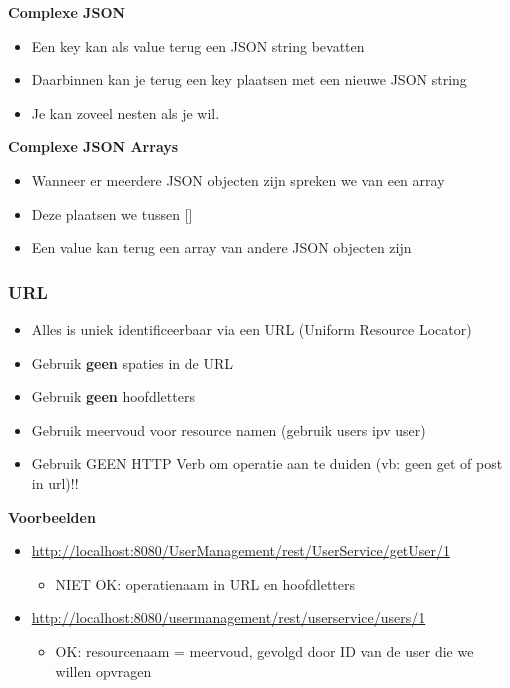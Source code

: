 \documentclass{article}
\newcommand{\bold}[1]{\textbf{#1}}
\begin{document}
\bold{Complexe JSON}

\begin{itemize}
    \item Een key kan als value terug een JSON string bevatten
    \item Daarbinnen kan je terug een key plaatsen met een nieuwe JSON string
    \item Je kan zoveel nesten als je wil.
\end{itemize}

\bold{Complexe JSON Arrays}

\begin{itemize}
    \item Wanneer er meerdere JSON objecten zijn spreken we van een array
    \item Deze plaatsen we tussen []
    \item Een value kan terug een array van andere JSON objecten zijn
\end{itemize}

\subsubsection{URL}
\begin{itemize}
    \item Alles is uniek identificeerbaar via een URL (Uniform Resource Locator)
    \item Gebruik \bold{geen} spaties in de URL
    \item Gebruik \bold{geen} hoofdletters
    \item Gebruik meervoud voor resource namen (gebruik users ipv user)
    \item Gebruik GEEN HTTP Verb om operatie aan te duiden (vb: geen get of post in url)!!
\end{itemize}

\bold{Voorbeelden}

\begin{itemize}
    \item \url{http://localhost:8080/UserManagement/rest/UserService/getUser/1} 
    \begin{itemize}
        \item NIET OK: operatienaam in URL en hoofdletters
    \end{itemize}
    \item \url{http://localhost:8080/usermanagement/rest/userservice/users/1} 
    \begin{itemize}
        \item OK: resourcenaam = meervoud, gevolgd door ID van de user die we willen opvragen
    \end{itemize}
\end{itemize}
\end{document}
